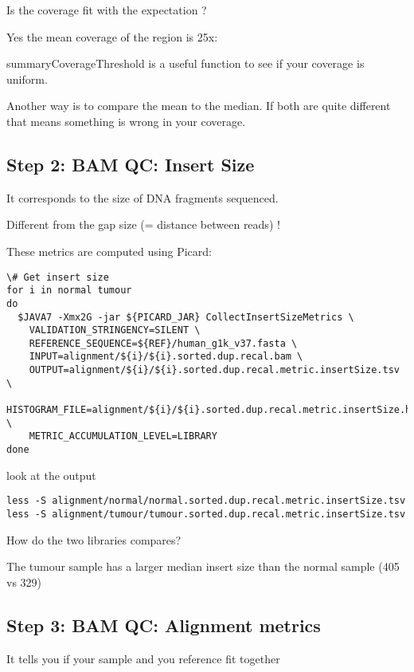 \begin{questions}
Is the coverage fit with the expectation ?
\end{questions}
\begin{answer}
Yes the mean coverage of the region is 25x:

summaryCoverageThreshold is a useful function to see if your coverage is uniform.
 
Another way is to compare the mean to the median. If both are quite different that means something is wrong in your coverage.
\end{answer}

\subsection{Step 2: BAM QC: Insert Size}
It corresponds to the size of DNA fragments sequenced.

Different from the gap size (= distance between reads) !

These metrics are computed using Picard:

\begin{lstlisting}
\# Get insert size
for i in normal tumour
do
  $JAVA7 -Xmx2G -jar ${PICARD_JAR} CollectInsertSizeMetrics \
    VALIDATION_STRINGENCY=SILENT \
    REFERENCE_SEQUENCE=${REF}/human_g1k_v37.fasta \
    INPUT=alignment/${i}/${i}.sorted.dup.recal.bam \
    OUTPUT=alignment/${i}/${i}.sorted.dup.recal.metric.insertSize.tsv \
    HISTOGRAM_FILE=alignment/${i}/${i}.sorted.dup.recal.metric.insertSize.histo.pdf \
    METRIC_ACCUMULATION_LEVEL=LIBRARY
done
\end{lstlisting}

look at the output

\begin{lstlisting}
less -S alignment/normal/normal.sorted.dup.recal.metric.insertSize.tsv
less -S alignment/tumour/tumour.sorted.dup.recal.metric.insertSize.tsv
\end{lstlisting}

\begin{questions}
How do the two libraries compares? 
\end{questions}
\begin{answer}
The tumour sample has a larger median insert size than the normal sample (405 vs 329) 
\end{answer}

\subsection{Step 3: BAM QC: Alignment metrics}
It tells you if your sample and you reference fit together

